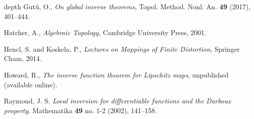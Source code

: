 \documentclass[a4, 12pt,leqno]{amsart}
\theoremstyle{plain}
\theoremstyle{definition}
\theoremstyle{remark}
\numberwithin{equation}{section}
\begin{document}
\begin{thebibliography}{depth}
Gut\'{u}, O., 
\textit{On global inverse theorems}, Topol. Method. Nonl. An. {\bf 49} (2017), 401--444.


Hatcher, A.,
\textit{Algebraic Topology}, Cambridge University Press, 2001.

Hencl, S. and Koskela, P.,
\textit{Lectures on Mappings of Finite Distortion},
Springer Cham, 2014.


Howard, R.,
\textit{The inverse function theorem for Lipschitz maps}, unpublished (available online).

Raymond, J. S.
\textit{Local inversion for differentiable functions and the Darboux property}.
Mathematika {\bf 49} no. 1-2 (2002), 141--158.


















%




%






\end{thebibliography}
\end{document}
